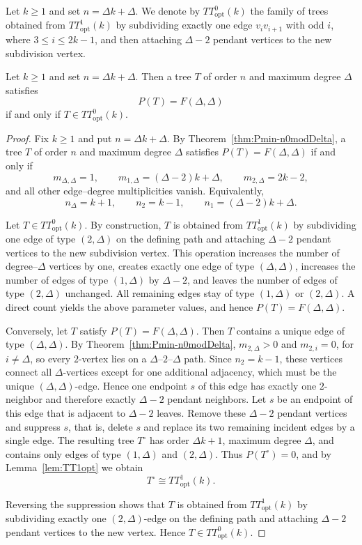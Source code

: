 \documentclass[preprint,12pt]{elsarticle}
\begin{document}
Let $k\ge 1$ and set $n=\Delta k+\Delta$.
We denote by $TT^0_{\mathrm{opt}}(k)$ the family of trees obtained from
$TT^1_{\mathrm{opt}}(k)$ by subdividing exactly one edge $v_iv_{i+1}$ with odd
$i$, where $3\le i\le 2k-1$, and then attaching $\Delta-2$ pendant vertices to the
new subdivision vertex.

\begin{lemma}
\label{lem:TT0opt}
Let $k\ge 1$ and set $n=\Delta k+\Delta$.
Then a tree $T$ of order $n$ and maximum degree $\Delta$ satisfies
\[
P(T)=F(\Delta,\Delta)
\]
if and only if $T\in TT^0_{\mathrm{opt}}(k)$.
\end{lemma}
\begin{proof}
Fix $k\ge1$ and put $n=\Delta k+\Delta$.
By Theorem~\ref{thm:Pmin-n0modDelta}, a tree $T$ of order $n$ and maximum degree
$\Delta$ satisfies $P(T)=F(\Delta,\Delta)$ if and only if
\[
m_{\Delta,\Delta}=1,\qquad
m_{1,\Delta}=(\Delta-2)k+\Delta,\qquad
m_{2,\Delta}=2k-2,
\]
and all other edge--degree multiplicities vanish.
Equivalently,
\[
n_\Delta=k+1,\qquad
n_2=k-1,\qquad
n_1=(\Delta-2)k+\Delta.
\]

\medskip\noindent

Let $T\in TT^0_{\mathrm{opt}}(k)$.
By construction, $T$ is obtained from $TT^1_{\mathrm{opt}}(k)$ by subdividing one
edge of type $(2,\Delta)$ on the defining path and attaching $\Delta-2$ pendant
vertices to the new subdivision vertex.
This operation increases the number of degree--$\Delta$ vertices by one, creates
exactly one edge of type $(\Delta,\Delta)$, increases the number of edges of type
$(1,\Delta)$ by $\Delta-2$, and leaves the number of edges of type $(2,\Delta)$
unchanged.
All remaining edges stay of type $(1,\Delta)$ or $(2,\Delta)$.
A direct count yields the above parameter values, and hence
$P(T)=F(\Delta,\Delta)$.


\medskip\noindent

Conversely, let $T$ satisfy $P(T)=F(\Delta,\Delta)$.
Then $T$ contains a unique edge of type $(\Delta,\Delta)$.
By Theorem~\ref{thm:Pmin-n0modDelta}, $m_{2,\Delta}>0$ and
$m_{2,i}=0$, for $i \neq \Delta$, so every $2$-vertex lies on a $\Delta$--$2$--$\Delta$ path.
Since $n_2=k-1$, these vertices connect all $\Delta$-vertices except for one
additional adjacency, which must be the unique $(\Delta,\Delta)$-edge.
Hence one endpoint $s$ of this edge has exactly one $2$-neighbor and therefore
exactly $\Delta-2$ pendant neighbors.
Let $s$ be an endpoint of this edge that is adjacent to $\Delta-2$ leaves.
Remove these $\Delta-2$ pendant vertices and suppress $s$, that is, delete $s$ and
replace its two remaining incident edges by a single edge.
The resulting tree $T^\circ$ has order $\Delta k+1$, maximum degree $\Delta$, and
contains only edges of type $(1,\Delta)$ and $(2,\Delta)$.
Thus $P(T^\circ)=0$, and by Lemma~\ref{lem:TT1opt} we obtain
\[
T^\circ \cong TT^1_{\mathrm{opt}}(k).
\]

Reversing the suppression shows that $T$ is obtained from
$TT^1_{\mathrm{opt}}(k)$ by subdividing exactly one $(2,\Delta)$-edge on the
defining path and attaching $\Delta-2$ pendant vertices to the new vertex.
Hence $T\in TT^0_{\mathrm{opt}}(k)$.
\end{proof}
\end{document}
